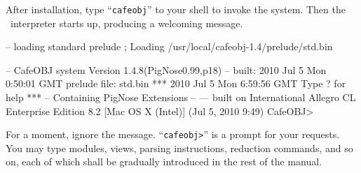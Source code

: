 \documentclass[a4paper]{memoir}
\begin{document}
After installation, type ``\verb|cafeobj|'' to your shell to
invoke the system. Then the \cafeobj~interpreter starts up, producing
a welcoming message.
%
%
%
\begin{vvtm}
\begin{ccode}
-- loading standard prelude
; Loading /usr/local/cafeobj-1.4/prelude/std.bin

          -- CafeOBJ system Version 1.4.8(PigNose0.99,p18) --
                   built: 2010 Jul 5 Mon 0:50:01 GMT
                         prelude file: std.bin
                                  ***
                      2010 Jul 5 Mon 6:59:56 GMT
                            Type ? for help
                                  ***
                  -- Containing PigNose Extensions --
                                  ---
         built on International Allegro CL Enterprise Edition
               8.2 [Mac OS X (Intel)] (Jul 5, 2010 9:49)
CafeOBJ>
\end{ccode}
\end{vvtm}
For a moment, ignore the message.
``\verb|cafeobj>|'' is a prompt for your requests. You may type
modules, views, parsing instructions, reduction commands, and so on,
each of which shall be gradually introduced in the rest of the manual.
\end{document}

